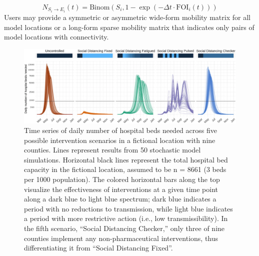{\begin{equation}
N_{S_i \to E_i} (t) = \text{Binom}\left(S_i ,1 - \exp \left(- \Delta t \cdot\text{FOI}_{i}(t) \right) \right)
\end{equation}
Users may provide a symmetric or asymmetric wide-form mobility matrix for all model locations or a long-form sparse mobility matrix that indicates only pairs of model locations with connectivity.
\begin{figure}[!htb]%
    \centering
    \includegraphics{fig_pipeline/fig2a}
    \caption[Time series of daily number of hospital beds needed across scenarios.]{Time series of daily number of hospital beds needed across five possible intervention scenarios in a fictional location with nine counties. Lines represent results from 50 stochastic model simulations. Horizontal black lines represent the total hospital bed capacity in the fictional location, assumed to be n = 8661 (3 beds per 1000 population). The colored horizontal bars along the top visualize the effectiveness of interventions at a given time point along a dark blue to light blue spectrum; dark blue indicates a period with no reductions to transmission, while light blue indicates a period with more restrictive action (i.e., low transmissibility). In the fifth scenario, “Social Distancing Checker,” only three of nine counties implement any non-pharmaceutical interventions, thus differentiating it from “Social Distancing Fixed”.}
    \label{fig:pipeline-seir}
\end{figure}


}
